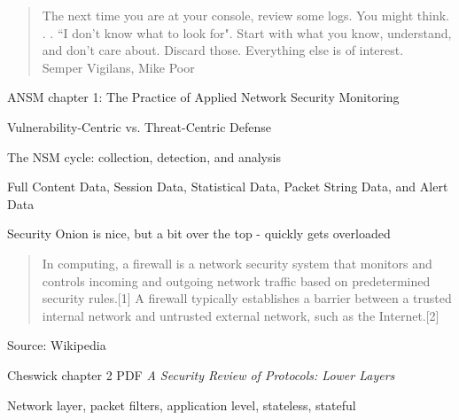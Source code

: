 \documentclass[Screen16to9,17pt]{foils}
\begin{document}
\begin{quote}
The next time you are at your console, review some logs. You might think. . . “I
don’t know what to look for". Start with what you know, understand, and don’t care about. Discard those. Everything else is of interest.\\
Semper Vigilans,
Mike Poor
\end{quote}



\begin{list1}
\item ANSM chapter 1: The Practice of Applied
Network Security Monitoring
\begin{list2}
\item Vulnerability-Centric vs. Threat-Centric Defense
\item The NSM cycle: collection, detection, and analysis
\item Full Content Data, Session Data, Statistical Data, Packet String Data, and Alert Data
\item Security Onion is nice, but a bit over the top - quickly gets overloaded
\end{list2}
\end{list1}



\begin{quote}
In computing, a firewall is a network security system that monitors and controls incoming and outgoing network traffic based on predetermined security rules.[1] A firewall typically establishes a barrier between a trusted internal network and untrusted external network, such as the Internet.[2]
\end{quote} Source: Wikipedia

\begin{list1}
\item {}
\item {}
\item Cheswick chapter 2 PDF
\emph{A Security Review of Protocols:
Lower Layers}
\begin{list2}
\item Network layer, packet filters, application level, stateless, stateful
\end{list2}
\end{list1}
\end{document}
